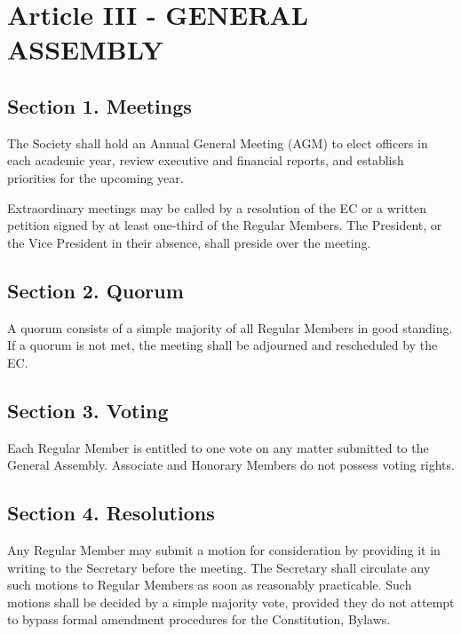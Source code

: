 \documentclass[a4paper]{article}
\begin{document}
\section*{Article III - GENERAL ASSEMBLY}


\subsection*{Section 1. Meetings}
The Society shall hold an Annual General Meeting (AGM) to elect officers in each academic year, review executive and financial reports, and establish priorities for the upcoming year.

Extraordinary meetings may be called by a resolution of the EC or a written petition signed by at least one-third of the Regular Members. The President, or the Vice President in their absence, shall preside over the meeting.


\subsection*{Section 2. Quorum}
A quorum consists of a simple majority of all Regular Members in good standing. If a quorum is not met, the meeting shall be adjourned and rescheduled by the EC.

\subsection*{Section 3. Voting}

Each Regular Member is entitled to one vote on any matter submitted to the General Assembly. Associate and Honorary Members do not possess voting rights.

\subsection*{Section 4. Resolutions}

Any Regular Member may submit a motion for consideration by providing it in writing to the Secretary before the meeting. The Secretary shall circulate any such motions to
Regular Members as soon as reasonably practicable. Such motions shall be decided by a simple majority vote, provided they do not attempt to bypass formal amendment procedures for the Constitution, Bylaws.
\end{document}
